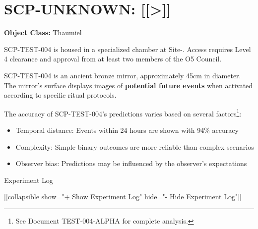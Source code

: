 \section{SCP-UNKNOWN: [[\textgreater{}]]}

\textbf{Object Class:} Thaumiel

\containment

SCP-TEST-004 is housed in a specialized chamber at Site-\blackbox{}\blackbox{}. Access requires Level 4 clearance and approval from at least two members of the O5 Council.

\scpdescription

SCP-TEST-004 is an ancient bronze mirror, approximately 45cm in diameter. The mirror's surface displays images of \textbf{potential future events} when activated according to specific ritual protocols.

The accuracy of SCP-TEST-004's predictions varies based on several factors\footnote{See Document TEST-004-ALPHA for complete analysis.}:

\begin{itemize}
\item Temporal distance: Events within 24 hours are shown with 94\% accuracy
\item Complexity: Simple binary outcomes are more reliable than complex scenarios
\item Observer bias: Predictions may be influenced by the observer's expectations
\end{itemize}


Experiment Log

[[collapsible show="+ Show Experiment Log" hide="- Hide Experiment Log"]]

